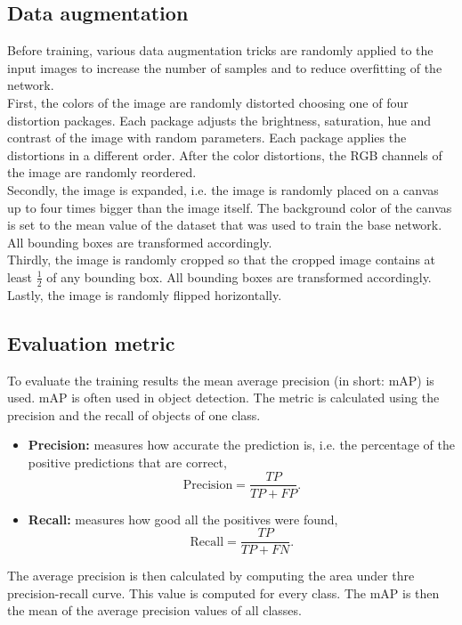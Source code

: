 \subsection{Data augmentation}

Before training, various data augmentation tricks are randomly applied to the input images to increase the number of samples and to reduce overfitting of the network. \\

First, the colors of the image are randomly distorted choosing one of four distortion packages. Each package adjusts the brightness, saturation, hue and contrast of the image with random parameters. Each package applies the distortions in a different order. After the color distortions, the RGB channels of the image are randomly reordered. \\

Secondly, the image is expanded, i.e. the image is randomly placed on a canvas up to four times bigger than the image itself. The background color of the canvas is set to the mean value of the dataset that was used to train the base network. All bounding boxes are transformed accordingly. \\

Thirdly, the image is randomly cropped so that the cropped image contains at least $\frac{1}{2}$ of any bounding box. All bounding boxes are transformed accordingly. \\

Lastly, the image is randomly flipped horizontally.

\subsection{Evaluation metric}

To evaluate the training results the mean average precision (in short: mAP) is used. mAP is often used in object detection. The metric is calculated using the precision and the recall of objects of one class.
\begin{itemize}
  \item \textbf{Precision:} measures how accurate the prediction is, i.e. the percentage of the positive predictions that are correct,
  \begin{equation*}
    \text{Precision} = \frac{TP}{TP + FP}.
  \end{equation*}
  \item \textbf{Recall:} measures how good all the positives were found,
  \begin{equation*}
    \text{Recall} = \frac{TP}{TP + FN}.
  \end{equation*}
\end{itemize}

The average precision is then calculated by computing the area under thre precision-recall curve. This value is computed for every class. The mAP is then the mean of the average precision values of all classes.
